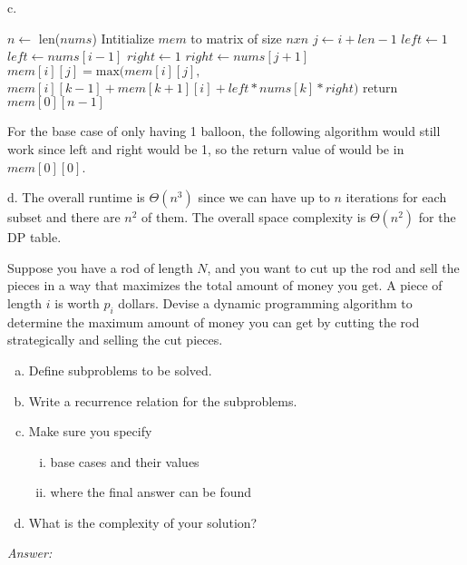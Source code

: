 \documentclass[12pt]{article}
\newenvironment{problem}[2][Problem]{\begin{trivlist}
\item[\hskip \labelsep {\bfseries #1}\hskip \labelsep {\bfseries #2.}]}{\end{trivlist}}
\begin{document}
c. 
\begin{algorithmic}
        \State $n\gets$ len($nums$)
        \State Intitialize $mem$ to matrix of size $n x n$
                \State $j \gets i+len-1$
                     $left \gets 1$
                    \Else  \text{ } $left \gets nums[i-1]$
                    \EndIf
                     $right \gets 1$
                    \Else \text{ }$right \gets nums[j+1]$
                    \EndIf
                    \State $mem[i][j] = \text{max}(mem[i][j],$ \\ $ mem[i][k-1]+mem[k+1][i] + left*nums[k]*right)$
                \EndFor
            \EndFor
        \EndFor
        \State return $mem[0][n-1]$
    \EndProcedure
\end{algorithmic}
For the base case of only having 1 balloon, the following algorithm would still work since left and right would be 1, so the return value of would be in $mem[0][0]$.

d. The overall runtime is $\Theta(n^3)$ since we can have up to $n$ iterations for each subset and there are $n^2$ of them. The overall space complexity is $\Theta(n^2)$ for the DP table.
\begin{problem}{4}
    Suppose you have a rod of length $N$, and you want to cut up the rod and sell the pieces in a way that maximizes the total amount of money you get. A piece of length $i$ is worth $p_i$ dollars. Devise a dynamic programming algorithm to determine the maximum amount of money you can get by cutting the rod strategically and selling the cut pieces.
    
    \begin{enumerate}[a.]
        \item Define subproblems to be solved.
        \item Write a recurrence relation for the subproblems.
        \item Make sure you specify
        \begin{enumerate}[i.]
            \item base cases and their values
            \item where the final answer can be found
        \end{enumerate}
        \item What is the complexity of your solution?
    \end{enumerate}
\end{problem}
\textit{Answer:}
\end{document}
